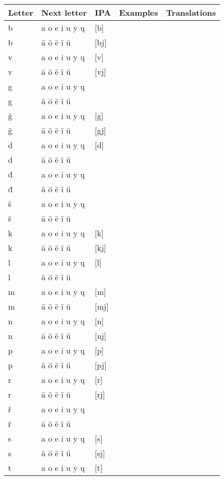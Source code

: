 \begin{longtable}{lllll}
		Letter & Next letter & IPA & Examples & Translations \\
		\endhead
		b & a o e i u y ų  & [b] && \\
		b & ä ö ë ï ü & [bj] && \\
		v & a o e i u y ų & [v] && \\
		v & ä ö ë ï ü & [vj] && \\
		g & a o e i u y ų & \textipa{[H]} && \\
		g & ä ö ë ï ü & \textipa{[Hj]} && \\
		ĝ & a o e i u y ų  & [g] && \\
		ĝ & ä ö ë ï ü & [gj] && \\
		d & a o e i u y ų & [d] && \\
		d & ä ö ë ï ü & \textipa{[\textbardotlessj]} && \\	
		đ & a o e i u y ų & \textipa{[\t{\:d\:z}]} & & \\
		đ & ä ö ë ï ü & \textipa{[\t{dZ}]} && \\
		ŝ & a o e i u y ų  & \textipa{[\t{dz}]} && \\
		ŝ & ä ö ë ï ü & \textipa{[\t{dzj}]} && \\
		k & a o e i u y ų & [k] && \\  
		k & ä ö ë ï ü  & [kj] && \\ 
		l & a o e i u y ų  & [l] && \\  
		l & ä ö ë ï ü  & \textipa{[L]} && \\ 
		m & a o e i u y ų  & [m] && \\  
		m & ä ö ë ï ü  & [mj] && \\
		n & a o e i u y ų  & [n] && \\  
		n & ä ö ë ï ü  & [nj] && \\
		p & a o e i u y ų & [p] && \\  
		p & ä ö ë ï ü  & [pj] && \\ 
		r & a o e i u y ų  & [r] && \\  
		r & ä ö ë ï ü  & [rj] && \\
		ř & a o e i u y ų  & \textipa{[\r*r]} && \\  
		ř & ä ö ë ï ü  & \textipa{[\r*rj]} && \\ 
		s & a o e i u y ų & [s] && \\  
		s & ä ö ë ï ü  & [sj] && \\ 
		t & a o e i u y ų  & [t] && \\ 

\end{longtable}
